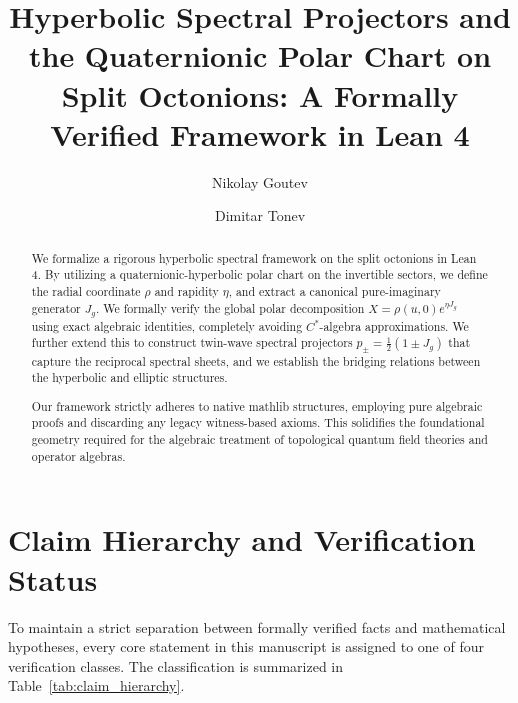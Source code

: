 \documentclass{article}
\title{
Hyperbolic Spectral Projectors and the Quaternionic Polar Chart on Split Octonions:
A Formally Verified Framework in Lean 4
}
\author{Nikolay Goutev \and Dimitar Tonev}
\begin{document}
\maketitle

\begin{abstract}
We formalize a rigorous hyperbolic spectral framework on the split octonions in Lean 4.
By utilizing a quaternionic-hyperbolic polar chart on the invertible sectors, we define the radial coordinate $\rho$ and rapidity $\eta$, and extract a canonical pure-imaginary generator $J_g$. We formally verify the global polar decomposition $X = \rho(u, 0) e^{\eta J_g}$ using exact algebraic identities, completely avoiding $C^*$-algebra approximations. We further extend this to construct twin-wave spectral projectors $p_\pm = \frac{1}{2}(1 \pm J_g)$ that capture the reciprocal spectral sheets, and we establish the bridging relations between the hyperbolic and elliptic structures.

Our framework strictly adheres to native mathlib structures, employing pure algebraic proofs and discarding any legacy witness-based axioms. This solidifies the foundational geometry required for the algebraic treatment of topological quantum field theories and operator algebras.
\end{abstract}

\section*{Claim Hierarchy and Verification Status}
To maintain a strict separation between formally verified facts and mathematical hypotheses, every core statement in this manuscript is assigned to one of four verification classes. The classification is summarized in Table~\ref{tab:claim_hierarchy}.
\end{document}
